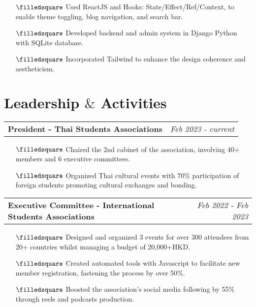\documentclass[letterpaper,10.8pt]{article}
\makeatletter
\newcommand{\headerrow}[4]{%
  \vspace{#4}
  \begin{tabular*}{\dimexpr\linewidth}{@{\extracolsep{\fill}}lr@{}}
    \hspace{#1}\hspace{0.1cm} #2 &
    #3 \\
  \end{tabular*}%
}
\makeatother
\begin{document}
\vspace{-5.5mm}
\begin{itemize}[leftmargin=7mm]
  \itemsep-0.7mm
  \item[$\filledsquare$] Used ReactJS and Hooks: State/Effect/Ref/Context, to enable theme toggling, blog navigation, and search bar.
  \item[$\filledsquare$] Developed backend and admin system in Django Python with SQLite database.
  \item[$\filledsquare$] Incorporated Tailwind to enhance the design coherence and aestheticism.
\end{itemize}


\section{\textbf{Leadership $\&$ Activities}}
\headerrow{0mm}{\textbf{President - Thai Students Associations }}{\textit{Feb 2023 - current}}{0mm}
\vspace{-5.5mm}
\begin{itemize}[leftmargin=7mm]
  \itemsep-0.7mm
  \item[$\filledsquare$] Chaired the 2nd cabinet of the association, involving 40+ members and 6 executive committees.
  \item[$\filledsquare$] Organized Thai cultural events with $70\%$ participation of foreign students promoting cultural exchanges and bonding.
\end{itemize}
\headerrow{0mm}{\textbf{Executive Committee - International Students Associations }}{\textit{Feb 2022 - Feb 2023}}{0mm}
\vspace{-5.5mm}
\begin{itemize}[leftmargin=7mm]
  \itemsep-0.7mm
  \item[$\filledsquare$] Designed and organized 3 events for over 300 attendees from 20+ countries whilst managing a budget of 20,000+HKD.
  \item[$\filledsquare$] Created automated tools with Javascript to facilitate new member registration, fastening the process by over 50$\%$.
  \item[$\filledsquare$] Boosted the association's social media following by 55$\%$ through reels and podcasts production.
\end{itemize}
\end{document}
